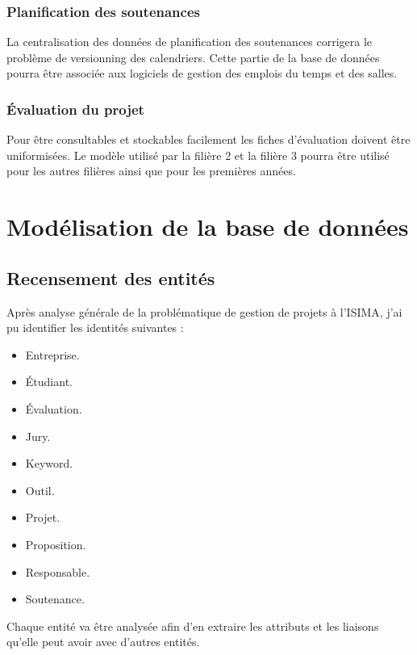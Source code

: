 \documentclass[a4paper,11pt]{report}
\begin{document}
\subsection{Planification des soutenances}

\normalsize{
La centralisation des données de planification des soutenances corrigera le problème de versionning des calendriers. Cette partie de la base de données pourra être associée aux logiciels de gestion des emplois du temps et des salles. 
}

\subsection{Évaluation du projet}

\normalsize{
Pour être consultables et stockables facilement les fiches d'évaluation doivent être uniformisées. Le modèle utilisé par la filière 2 et la filière 3 pourra être utilisé pour les autres filières ainsi que pour les premières années.  
}


\chapter {Modélisation de la base de données}

\section{Recensement des entités }

\normalsize{
Après analyse générale de la problématique de gestion de projets à l'ISIMA, j'ai pu identifier les identités suivantes :
}

\begin{itemize}
\item Entreprise.
\item Étudiant.
\item Évaluation.
\item Jury.
\item Keyword.
\item Outil.
\item Projet.
\item Proposition.
\item Responsable.
\item Soutenance. \\
\end{itemize}

\normalsize{
Chaque entité va être analysée afin d'en extraire les attributs et les liaisons qu'elle peut avoir avec d'autres entités.
}
\end{document}
